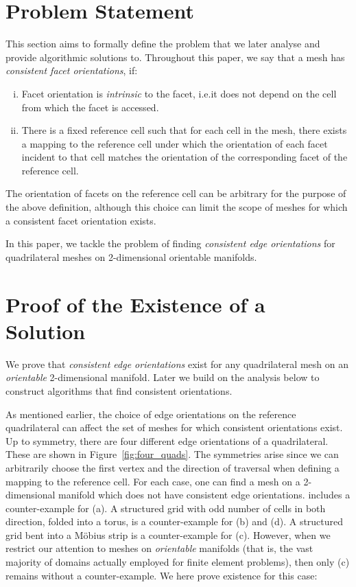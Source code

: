 \documentclass[oneeqnum,onethmnum,onefignum,onetabnum]{siamltex1213}
\begin{document}
\section{Problem Statement}
\label{sec:statement}

This section aims to formally define the problem that we later
analyse and provide algorithmic solutions to.
Throughout this paper, we say that a mesh has \emph{consistent facet
  orientations}, if:
\begin{enumerate}[(i)]
  \item Facet orientation is \emph{intrinsic} to the facet, i.e.\@ it
    does not depend on the cell from which the facet is accessed.
  \item There is a fixed reference cell such that for each cell in the mesh,
    there exists a mapping to the reference cell under which the orientation
    of each facet incident to that cell matches the orientation of the
    corresponding facet of the reference cell.
\end{enumerate}
The orientation of facets on the reference cell can be arbitrary for
the purpose of the above definition,
although this choice can limit the scope of meshes for which a
consistent facet orientation exists.

In this paper, we tackle the problem of finding \emph{consistent
  edge orientations} for quadrilateral meshes on 2-dimensional
orientable manifolds.

\section{Proof of the Existence of a Solution}
\label{sec:analysis}

We prove that \emph{consistent edge orientations} exist for any
quadrilateral mesh on an \emph{orientable} 2-dimensional manifold.
Later we build on the analysis below to construct algorithms that
find consistent orientations.

As mentioned earlier, the choice of edge orientations on the
reference quadrilateral can affect the set of meshes for which
consistent orientations exist.
Up to  symmetry, there are four different edge orientations of a
quadrilateral. These are shown in Figure~\ref{fig:four_quads}. The
symmetries arise since
we can arbitrarily choose the first vertex and the direction of
traversal when defining a mapping to the reference cell.
For each case, one can find a mesh on a 2-dimensional manifold which
does not have consistent edge orientations. \cite{Bangerth} includes a
counter-example for (a). A structured grid with odd number of cells in
both direction, folded into a torus, is a counter-example for (b) and
(d). A structured grid bent into a Möbius strip is a counter-example
for (c). However, when we restrict our attention to meshes on
\emph{orientable} manifolds (that is, the vast majority of domains actually
employed for finite element problems), then only (c) remains without a
counter-example. We here prove existence for this case:
\end{document}
